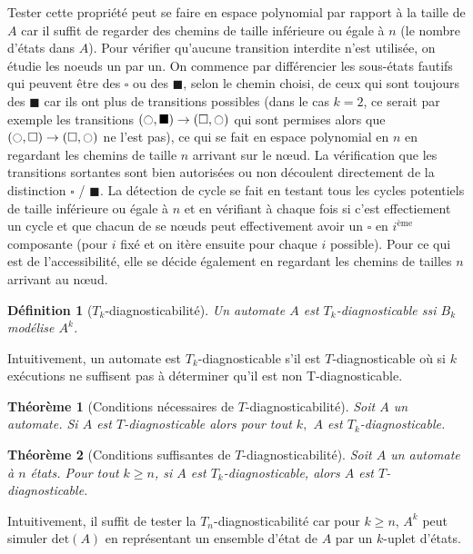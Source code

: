 \documentclass[conference]{IEEEtran}
\newtheorem{mydef}{D\'efinition}
\newtheorem{myth}{Th\'eor\`eme}
\newcommand{\es}{\square}
\newcommand{\fs}{\blacksquare}
\newcommand{\ec}{\ocircle}
\begin{document}
Tester cette propriété peut se faire en espace polynomial par rapport à la taille de $A$ car il suffit de regarder des chemins de taille inférieure ou égale à $n$ (le nombre d'états dans $A$). Pour vérifier qu'aucune transition interdite n'est utilisée, on étudie les noeuds un par un. On commence par différencier les sous-états fautifs qui peuvent être des $\es$ ou des $\fs$, selon le chemin choisi, de ceux qui sont toujours des $\fs$ car ils ont plus de transitions possibles (dans le cas $k=2$, ce serait par exemple les transitions $(\ec,\fs)\to (\es, \ec)$ qui sont permises alors que $(\ec,\es)\to (\es, \ec)$ ne l'est pas), ce qui se fait en espace polynomial en $n$ en regardant les chemins de taille $n$ arrivant sur le nœud. La vérification que les transitions sortantes sont bien autorisées ou non découlent directement de la distinction $\es$ / $\fs$. La détection de cycle se fait en testant tous les cycles potentiels de taille inférieure ou égale à $n$ et en vérifiant à chaque fois si c'est effectiement un cycle et que chacun de se nœuds peut effectivement avoir un $\es$ en $i^\text{ème}$ composante (pour $i$ fixé et on itère ensuite pour chaque $i$ possible). Pour ce qui est de l'accessibilité, elle se décide également en regardant les chemins de tailles $n$ arrivant au nœud.

\begin{mydef}[$T_k$-diagnosticabilité]
Un automate $A$ est $T_k$-diagnosticable ssi $B_k$ modélise $A^k$.
\end{mydef}

Intuitivement, un automate est $T_k$-diagnosticable s'il est $T$-diagnosticable où si $k$ exécutions ne suffisent pas à déterminer qu'il est non T-diagnosticable.

\begin{myth}[Conditions nécessaires de $T$-diagnosticabilité]
Soit $A$ un automate. Si $A$ est $T$-diagnosticable alors pour tout $k,$ $A$ est $T_k$-diagnosticable.
\end{myth}

\begin{myth}[Conditions suffisantes de $T$-diagnosticabilité]
Soit $A$ un automate \`a $n$ états. Pour tout $k \ge n$, si $A$ est $T_k$-diagnosticable, alors $A$ est $T$-diagnosticable.
\end{myth}

Intuitivement, il suffit de tester la $T_n$-diagnosticabilité car pour $k\ge n$, $A^k$ peut simuler $\text{det}(A)$ en représentant un ensemble d'état de $A$ par un $k$-uplet d'états. 
\end{document}
